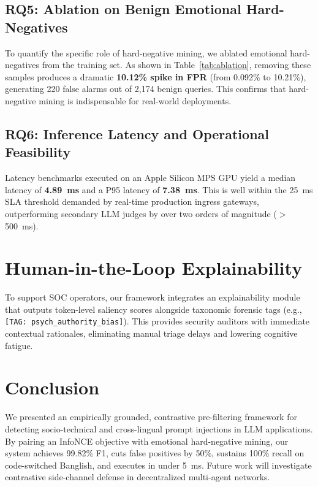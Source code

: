 \documentclass[journal]{IEEEtran}
\begin{document}
\subsection{RQ5: Ablation on Benign Emotional Hard-Negatives}
To quantify the specific role of hard-negative mining, we ablated emotional hard-negatives from the training set. As shown in Table~\ref{tab:ablation}, removing these samples produces a dramatic \textbf{10.12\% spike in FPR} (from 0.092\% to 10.21\%), generating 220 false alarms out of 2,174 benign queries. This confirms that hard-negative mining is indispensable for real-world deployments.

\subsection{RQ6: Inference Latency and Operational Feasibility}
Latency benchmarks executed on an Apple Silicon MPS GPU yield a median latency of \textbf{4.89~ms} and a P95 latency of \textbf{7.38~ms}. This is well within the 25~ms SLA threshold demanded by real-time production ingress gateways, outperforming secondary LLM judges by over two orders of magnitude ($>$500~ms).

\section{Human-in-the-Loop Explainability}
To support SOC operators, our framework integrates an explainability module that outputs token-level saliency scores alongside taxonomic forensic tags (e.g., \texttt{[TAG: psych\_authority\_bias]}). This provides security auditors with immediate contextual rationales, eliminating manual triage delays and lowering cognitive fatigue.

\section{Conclusion}
We presented an empirically grounded, contrastive pre-filtering framework for detecting socio-technical and cross-lingual prompt injections in LLM applications. By pairing an InfoNCE objective with emotional hard-negative mining, our system achieves 99.82\% F1, cuts false positives by 50\%, sustains 100\% recall on code-switched Banglish, and executes in under 5~ms. Future work will investigate contrastive side-channel defense in decentralized multi-agent networks.
\end{document}
